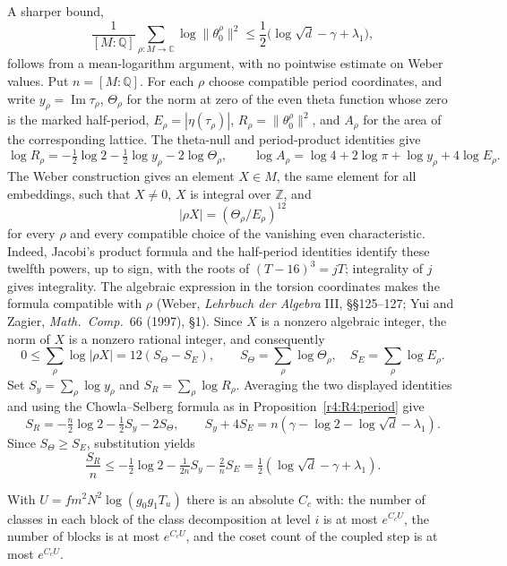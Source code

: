 A sharper bound,
\[
  \frac1{[M:\mathbb Q]}\sum_{\rho:M\to\mathbb C}
    \log\lVert\theta_0^\rho\rVert^2
  \leq \frac12\bigl(\log\sqrt d-\gamma+\lambda_1\bigr),
\]
follows from a mean-logarithm argument, with no pointwise estimate on Weber
values.  Put $n=[M:\mathbb Q]$.  For each $\rho$ choose compatible period
coordinates, and write $y_\rho=\operatorname{Im}\tau_\rho$,
$\Theta_\rho$ for the norm at zero of the even theta function whose zero is the marked half-period, $E_\rho=|\eta(\tau_\rho)|$,
$R_\rho=\lVert\theta_0^\rho\rVert^2$, and $A_\rho$ for the area of the
corresponding lattice.  The theta-null and period-product identities give
\[
  \log R_\rho=-\tfrac12\log2-\tfrac12\log y_\rho-2\log\Theta_\rho,
  \qquad
  \log A_\rho=\log4+2\log\pi+\log y_\rho+4\log E_\rho .
\]
The Weber construction gives an element $X\in M$, the same element for
all embeddings, such that $X\ne0$, $X$ is integral over $\mathbb Z$, and
\[
  |\rho X|=(\Theta_\rho/E_\rho)^{12}
\]
for every $\rho$ and every compatible choice of the vanishing even
characteristic.  Indeed, Jacobi's product formula and the half-period
identities identify these twelfth powers, up to sign, with the roots of
$(T-16)^3=jT$; integrality of $j$ gives integrality.  The algebraic expression
in the torsion coordinates makes the formula compatible with $\rho$
(Weber, \emph{Lehrbuch der Algebra} III, \S\S125--127; Yui and Zagier,
\emph{Math.\ Comp.}\ 66 (1997), \S1).  Since $X$ is a nonzero algebraic
integer, the norm of $X$ is a nonzero rational integer, and consequently
\[
  0\leq\sum_\rho\log|\rho X|=12(S_\Theta-S_E),\qquad
  S_\Theta=\sum_\rho\log\Theta_\rho,\quad S_E=\sum_\rho\log E_\rho .
\]
Set $S_y=\sum_\rho\log y_\rho$ and $S_R=\sum_\rho\log R_\rho$.  Averaging the
two displayed identities and using the Chowla--Selberg formula as in
Proposition~\ref{r4:R4:period} give
\[
  S_R=-\tfrac n2\log2-\tfrac12S_y-2S_\Theta,
  \qquad
  S_y+4S_E=n(\gamma-\log2-\log\sqrt d-\lambda_1).
\]
Since $S_\Theta\geq S_E$, substitution yields
\[
  \frac{S_R}{n}
  \leq-\tfrac12\log2-\tfrac1{2n}S_y-\tfrac2nS_E
  =\tfrac12(\log\sqrt d-\gamma+\lambda_1).
\]

\begin{hypothesis}\label{w3:W3:K5}
With $U=fm^2N^2\log(g_0g_1T_u)$ there is an absolute $C_c$ with: the number of classes in each block of the class decomposition at level $i$ is at most $e^{C_cU}$, the number of blocks is at most $e^{C_cU}$, and the coset count of the coupled step is at most $e^{C_cU}$.
\end{hypothesis}

